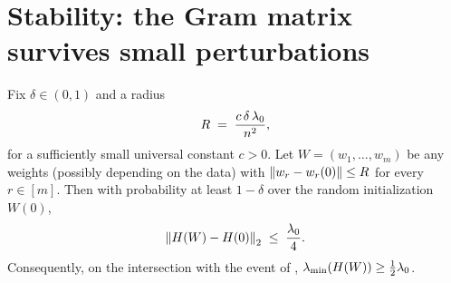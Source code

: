 \section{Stability: the Gram matrix survives small perturbations}\label{sec:gram-stability}

\begin{lemma}\label{lem:gram-stability}
Fix $\delta \in (0,1)$ and a radius
\begin{align}\label{eq:radius}
R \;=\; \frac{c\, \delta\, \lambda_{0}}{n^2},
\end{align}
for a sufficiently small universal constant $c > 0$. Let $W = (w_1, \dots, w_m)$ be any
weights (possibly depending on the data) with $\left\| w_r - w_r(0) \right\| \le R$ for every
$r \in [m]$. Then with probability at least $1 - \delta$ over the random initialization
$W(0)$,
\begin{align}\label{eq:gram-stable}
\left\| H(W) - H(0) \right\|_{2} \;\le\; \frac{\lambda_{0}}{4}.
\end{align}
Consequently, on the intersection with the event of ,
$\lambda_{\min}(H(W)) \ge \tfrac{1}{2}\lambda_{0}$.
\end{lemma}

